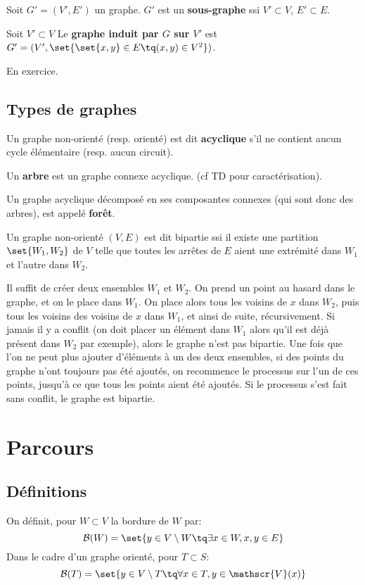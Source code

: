 \documentclass{scrartcl}
\begin{document}
			 Soit $G' = (V',E')$ un graphe.
			$G'$ est un \textbf{sous-graphe} ssi $V' \subset V$, $E' \subset E$.

			 Soit $V' \subset V$
			Le \textbf{graphe induit par $G$ sur $V'$} est $G' = (V', \set{\set{x,y}\in E \tq (x,y) \in V^2})$.

			\begin{demo}
				\item En exercice.
			\end{demo}
	
		\subsection{Types de graphes}
			 Un graphe non-orienté (resp. orienté) est dit \textbf{acyclique} s'il ne contient aucun cycle élémentaire (resp. aucun circuit).

			 Un \textbf{arbre} est un graphe connexe acyclique. (cf TD pour caractérisation).

			 Un graphe acyclique décomposé en ses composantes connexes (qui sont donc des arbres), est appelé \textbf{forêt}.

			 Un graphe non-orienté $(V,E)$ est dit bipartie ssi il existe une partition $\set{W_1,W_2}$ de $V$ telle que toutes les arrêtes de $E$
			aient une extrémité dans $W_1$ et l'autre dans $W_2$.

			 Il suffit de créer deux ensembles $W_1$ et $W_2$.
			On prend un point au hasard dans le graphe, et on le place dans $W_1$. On place alors tous les voisins de $x$ dans $W_2$,
			puis tous les voisins des voisins de $x$ dans $W_1$, et ainsi de suite, récursivement. 
			Si jamais il y a conflit (on doit placer un élément dans $W_1$ alors qu'il est déjà présent dans $W_2$ par exemple),
			alors le graphe n'est pas bipartie.
			Une fois que l'on ne peut plus ajouter d'éléments à un des deux ensembles, si des points du graphe n'ont toujours pas été ajoutés, 
			on recommence le processus sur l'un de ces points, jusqu'à ce que tous les points aient été ajoutés.
			Si le processus s'est fait sans conflit, le graphe est bipartie.

	\section{Parcours}
		\subsection{Définitions}
			On définit, pour $W \subset V$ la bordure de $W$ par:
				\[ 
					\mathcal{B}(W) = 
					\set{ y \in V\setminus W \tq \exists x \in W, {x,y} \in E}
				\]
			Dans le cadre d'un graphe orienté, pour $T \subset S$:
				\[ 
					\mathcal{B}(T) = 
					\set{ y \in V\setminus T \tq \forall x \in T, y \in \mathscr{V}(x) }
				\]
\end{document}

